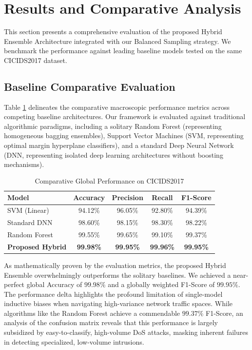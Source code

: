 \section{Results and Comparative Analysis}
This section presents a comprehensive evaluation of the proposed Hybrid Ensemble Architecture integrated with our Balanced Sampling strategy. We benchmark the performance against leading baseline models tested on the same CICIDS2017 dataset.

\subsection{Baseline Comparative Evaluation}
Table \ref{tab:overall_results} delineates the comparative macroscopic performance metrics across competing baseline architectures. Our framework is evaluated against traditional algorithmic paradigms, including a solitary Random Forest (representing homogeneous bagging ensembles), Support Vector Machines (SVM, representing optimal margin hyperplane classifiers), and a standard Deep Neural Network (DNN, representing isolated deep learning architectures without boosting mechanisms).

\begin{table}[htbp]
\centering
\caption{Comparative Global Performance on CICIDS2017}
\label{tab:overall_results}
\begin{tabular*}{\columnwidth}{@{\extracolsep{\fill}}lcccc@{}}
\toprule
\textbf{Model} & \textbf{Accuracy} & \textbf{Precision} & \textbf{Recall} & \textbf{F1-Score} \\
\midrule
SVM (Linear)         & 94.12\% & 96.05\% & 92.80\% & 94.39\% \\
Standard DNN         & 98.60\% & 98.15\% & 98.30\% & 98.22\% \\
Random Forest        & 99.55\% & 99.65\% & 99.10\% & 99.37\% \\
\midrule
\textbf{Proposed Hybrid} & \textbf{99.98\%} & \textbf{99.95\%} & \textbf{99.96\%} & \textbf{99.95\%} \\
\bottomrule
\end{tabular*}
\end{table}

As mathematically proven by the evaluation metrics, the proposed Hybrid Ensemble overwhelmingly outperforms the solitary baselines. We achieved a near-perfect global Accuracy of $99.98\%$ and a globally weighted F1-Score of $99.95\%$. The performance delta highlights the profound limitation of single-model inductive biases when navigating high-variance network traffic spaces. While algorithms like the Random Forest achieve a commendable $99.37\%$ F1-Score, an analysis of the confusion matrix reveals that this performance is largely subsidized by easy-to-classify, high-volume DoS attacks, masking inherent failures in detecting specialized, low-volume intrusions.

